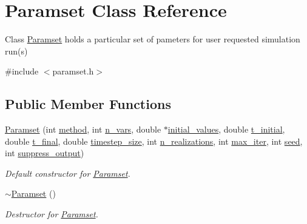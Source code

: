 \hypertarget{class_paramset}{}\section{Paramset Class Reference}
\label{class_paramset}


Class \hyperlink{class_paramset}{Paramset} holds a particular set of pameters for user requested simulation run(s)  




{\ttfamily \#include $<$paramset.\+h$>$}

\subsection*{Public Member Functions}
\begin{DoxyCompactItemize}
\item 
\hyperlink{class_paramset_a8d94d19a0afff74b1d37b0d2bcac4bc5}{Paramset} (int \hyperlink{class_paramset_a67376577973f825ba60fc7c319ccc906}{method}, int \hyperlink{class_paramset_aee56c5dcf7d40836397965cdcf392343}{n\+\_\+vars}, double $\ast$\hyperlink{class_paramset_aae7232620d4a9c0bbf30b12c37610c1e}{initial\+\_\+values}, double \hyperlink{class_paramset_a7d82a76c08567e5072aa1b125708c7d8}{t\+\_\+initial}, double \hyperlink{class_paramset_ac88cde461d8dbbd8a7d2636fc45f7119}{t\+\_\+final}, double \hyperlink{class_paramset_a0554913cf803a67bc59ffdee154abc24}{timestep\+\_\+size}, int \hyperlink{class_paramset_a50c0325e75983b66d0825406ec7873ac}{n\+\_\+realizations}, int \hyperlink{class_paramset_afeb86c327cd6966707996019609e6ed1}{max\+\_\+iter}, int \hyperlink{class_paramset_ab8a5866bb87cc2d78a69c47bacaeb06e}{seed}, int \hyperlink{class_paramset_a43e8f2987712248fa2139946af93c072}{suppress\+\_\+output})
\begin{DoxyCompactList}\small\item\em Default constructor for \hyperlink{class_paramset}{Paramset}. \end{DoxyCompactList}\item 
\hyperlink{class_paramset_af05c1383de964a28d93e0630d2f4670e}{$\sim$\+Paramset} ()
\begin{DoxyCompactList}\small\item\em Destructor for \hyperlink{class_paramset}{Paramset}. \end{DoxyCompactList}\end{DoxyCompactItemize}
